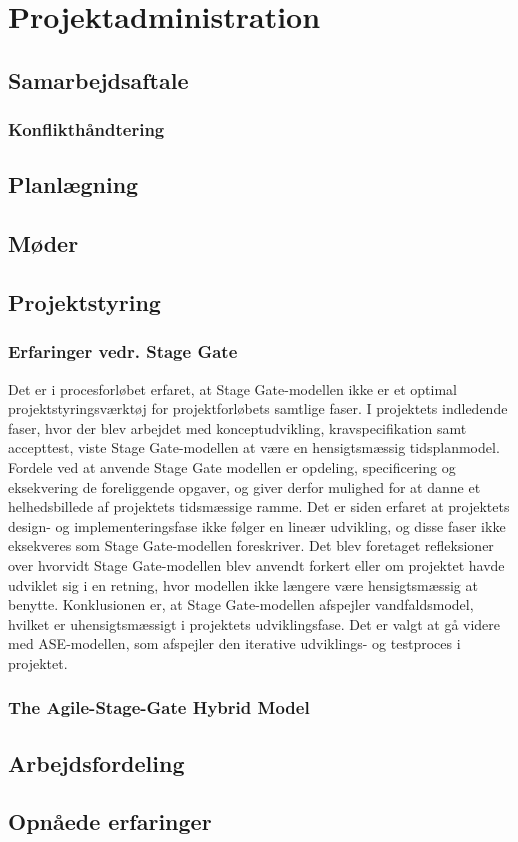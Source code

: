 \chapter{Projektadministration}

\section{Samarbejdsaftale}

	\subsection{Konflikthåndtering}

\section{Planlægning}
\section{Møder}
\section{Projektstyring}

	\subsection{Erfaringer vedr. Stage Gate}

	Det er i procesforløbet erfaret, at Stage Gate-modellen ikke er et optimal  projektstyringsværktøj for projektforløbets samtlige faser.
	I projektets indledende faser, hvor der blev arbejdet med konceptudvikling, kravspecifikation samt accepttest, viste Stage Gate-modellen at være en hensigtsmæssig tidsplanmodel. Fordele ved at anvende Stage Gate modellen er opdeling, specificering og eksekvering de foreliggende opgaver, og giver derfor mulighed for at danne et helhedsbillede af projektets tidsmæssige ramme. Det er siden erfaret at projektets design- og implementeringsfase ikke følger en lineær udvikling, og disse faser ikke eksekveres som Stage Gate-modellen foreskriver. Det blev foretaget refleksioner over hvorvidt Stage Gate-modellen blev anvendt forkert eller om projektet havde udviklet sig i en retning, hvor modellen ikke længere være hensigtsmæssig at benytte. Konklusionen er, at Stage Gate-modellen afspejler vandfaldsmodel, hvilket er uhensigtsmæssigt i projektets udviklingsfase. Det er valgt at gå videre med ASE-modellen, som afspejler den iterative udviklings- og testproces i projektet. 
	
	\subsection{The Agile-Stage-Gate Hybrid Model}
	
	
\section{Arbejdsfordeling}

\section{Opnåede erfaringer}
